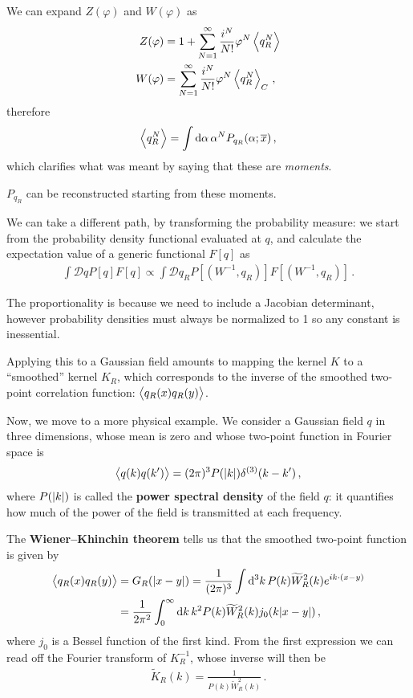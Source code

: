 \documentclass[main.tex]{subfiles}
\begin{document}
We can expand \(Z(\varphi )\) and \(W(\varphi )\) as 
%
\begin{align}
Z(\varphi ) &= 1 + \sum _{N=1}^{\infty } \frac{i^{N}}{N!} \varphi^{N} \expval{q_R^{N}} \\ 
W(\varphi ) &=  \sum _{N=1}^{\infty } \frac{i^{N}}{N!} \varphi^{N} \expval{q_R^{N}}_C  
\,,
\end{align}
%
therefore 
%
\begin{align}
\expval{q_R^{N}} = \int \dd{\alpha } \alpha^{N} P_{q_R} (\alpha ; \overline{x})
\,,
\end{align}
%
which clarifies what was meant by saying that these are \emph{moments}. 

\(P_{q_R}\) can be reconstructed starting from these moments. 

We can take a different path, by transforming the probability measure: we start from the probability density functional evaluated at \(q\), and calculate the expectation value of a generic functional \(F[q]\) as 
%
\begin{align}
\int \mathcal{D}q P[q] F[q]
\propto \int \mathcal{D}q_R P[(W^{-1}, q_R)] F[(W^{-1}, q_R)]
\,.
\end{align}

The proportionality is because we need to include a Jacobian determinant, however probability densities must always be normalized to 1 so any constant is inessential. 

Applying this to a Gaussian field amounts to mapping the kernel \(K\) to a ``smoothed'' kernel \(K_R\), which corresponds to the inverse of the smoothed two-point correlation function: \(\expval{q_R(x) q_R(y)}\). 

Now, we move to a more physical example. We consider a Gaussian field \(q\) in three dimensions, whose mean is zero and whose two-point function in Fourier space is 
%
\begin{align}
\expval{q(k) q(k')} = (2 \pi )^3 P(\abs{k}) \delta^{(3)} (k - k')
\,,
\end{align}
%
where \(P(\abs{k})\) is called the \textbf{power spectral density} of the field \(q\): it quantifies how much of the power of the field is transmitted at each frequency. 

The \textbf{Wiener–Khinchin theorem} tells us that the smoothed two-point function is given by 
%
\begin{align}
\expval{q_R (x) q_R(y)} &= G_R ( \abs{x-y}) = \frac{1}{(2 \pi )^3}
\int \dd[3]{k} P(k) \widetilde{W}^2_R(k) e^{i k \cdot (x-y)}  \\
&= \frac{1}{2 \pi^2} \int_0^{\infty } \dd{k } k^2 P(k) \widetilde{W}^2_R (k) j_0 (k \abs{x-y})
\,,
\end{align}
%
where \(j_0 \) is a Bessel function of the first kind. 
From the first expression we can read off the Fourier transform of \(K^{-1}_R\), whose inverse will then be 
%
\begin{align}
\widetilde{K}_R (k) = \frac{1}{P(k) \widetilde{W}_R^2(k)} 
\,.
\end{align}
\end{document}
